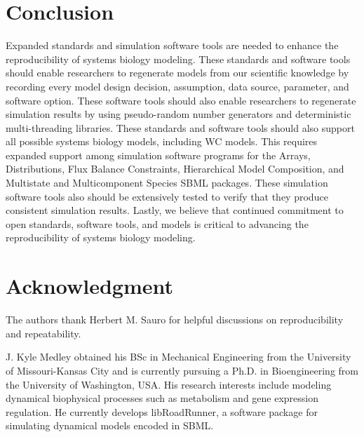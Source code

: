 \documentclass[journal,transmag,twoside]{IEEEtran}
\begin{document}
\section{Conclusion}

Expanded standards and simulation software tools are needed to enhance the reproducibility of systems biology modeling. These standards and software tools should enable researchers to regenerate models from our scientific knowledge by recording every model design decision, assumption, data source, parameter, and software option. These software tools should also enable researchers to regenerate simulation results by using pseudo-random number generators and deterministic multi-threading libraries. These standards and software tools should also support all possible systems biology models, including WC models. This requires expanded support among simulation software programs for the Arrays, Distributions, Flux Balance Constraints, Hierarchical Model Composition, and Multistate and Multicomponent Species SBML packages. These simulation software tools also should be extensively tested to verify that they produce consistent simulation results. Lastly, we believe that continued commitment to open standards, software tools, and models is critical to advancing the reproducibility of systems biology modeling.

\section{Acknowledgment}

The authors thank Herbert M. Sauro for helpful discussions
on reproducibility and repeatability.

\ifCLASSOPTIONcaptionsoff
  \newpage
\fi




\begin{IEEEbiography}{J. Kyle Medley}
obtained his BSc in Mechanical Engineering from the University of Missouri-Kansas City and
is currently pursuing a Ph.D. in Bioengineering from the University of Washington, USA.
His research interests include modeling dynamical biophysical processes such as
metabolism and gene expression regulation.
He currently develops libRoadRunner, a software package for simulating dynamical models encoded in SBML.
\end{IEEEbiography}
\end{document}
